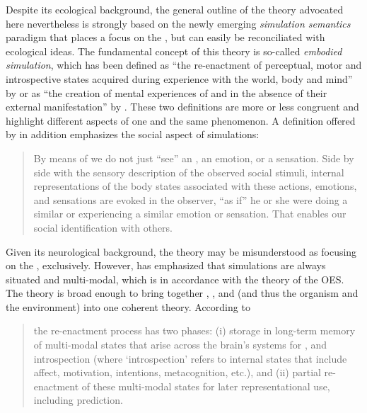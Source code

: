 Despite its ecological background, the general outline of the theory advocated here nevertheless is strongly based on the newly emerging \textit{simulation semantics} paradigm that places a focus on the , but can easily be reconciliated with ecological ideas. The fundamental concept of this theory is so-called \textit{embodied simulation}, which has been defined as “the re-enactment of perceptual, motor and introspective states acquired during experience with the world, body and mind” by \citet[1281]{Barsalou2009} or as “the creation of mental experiences of  and  in the absence of their external manifestation” by \citet[14]{Bergen2012}. These two definitions are more or less congruent and highlight different aspects of one and the same phenomenon. A definition offered by \citet[527]{Gallese2009} in addition emphasizes the social aspect of simulations:

\begin{quote}
By means of  we do not just “see” an , an emotion, or a sensation. Side by side with the sensory description of the observed social stimuli, internal representations of the body states associated with these actions, emotions, and sensations are evoked in the observer, “as if” he or she were doing a similar  or experiencing a similar emotion or sensation. That enables our social identification with others.
\end{quote}

\noindent Given its neurological background, the theory may be misunderstood as focusing on the , exclusively. However, \citet{Barsalou2009} has emphasized that simulations are always situated and multi-modal, which is in accordance with the theory of the OES. The theory is broad enough to bring together , , and  (and thus the organism and the environment) into one coherent theory. According to \citet[1281]{Barsalou2009}

\begin{quote}
the re-enactment process has two phases: (i) storage in long-term memory of multi-modal states that arise across the brain’s systems for ,  and introspection (where ‘introspection’ refers to internal states that include affect, motivation, intentions, metacognition, etc.), and (ii) partial re-enactment of these multi-modal states for later representational use, including prediction.
\end{quote}

